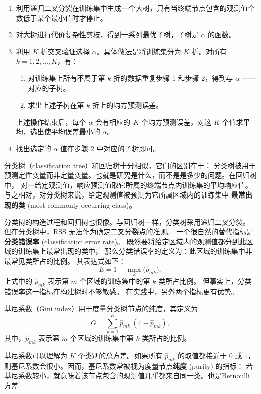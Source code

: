 \begin{example}[算法 8.1 建立回归树]
\begin{enumerate}
  \item 利用递归二叉分裂在训练集中生成一个大树，只有当终端节点包含的观测值个数低于某个最小值时才停止。
  \item 对大树进行代价复杂性剪枝，得到一系列最优子树，子树是 $\alpha$ 的函数。
  \item 利用 $K$ 折交叉验证选择 $\alpha$。具体做法是将训练集分为 $K$ 折。对所有 $k=1,2,\dots,K$，有：
  \begin{enumerate}
    \item[(a)] 对训练集上所有不属于第 $k$ 折的数据重复步骤 1 和步骤 2，得到与 $\alpha$ 一一对应的子树。
    \item[(b)] 求出上述子树在第 $k$ 折上的均方预测误差。
  \end{enumerate}
  上述操作结束后，每个 $\alpha$ 会有相应的 $K$ 个均方预测误差，对这 $K$ 个值求平均，选出使平均误差最小的 $\alpha$。
  \item 找出选定的 $\alpha$ 值在步骤 2 中对应的子树即可。
\end{enumerate}
\end{example}
\begin{definition}[分类树]
    分类树（classification tree）和回归树十分相似，它们的区别在于：
分类树被用于预测定性变量而非定量变量。也就是研究是什么，而不是是多少的问题。在回归树中，
对一给定观测值，响应预测值取它所属的终端节点内训练集的平均响应值。
与之相对，对分类树来说，给定观测值被预测为它所属区域内的训练集中
最\textbf{常出现的类} (most commonly occurring class)。

\end{definition}
分类树的构造过程和回归树也很像。与回归树一样，分类树采用递归二叉分裂。
但在分类树中，RSS 无法作为确定二叉分裂点的准则。
一个很自然的替代指标是\textbf{分类错误率} (classification error rate)。
既然要将给定区域内的观测值都分到此区域的训练集上最常出现的类中，
那么分类错误率的定义为：此区域的训练集中非最常见类所占的比例。
其表达式如下：
\[
E = 1 - \max_k \big(\hat{p}_{mk}\big),
\tag{8.5}
\]
上式中的 $\hat{p}_{mk}$ 表示第 $m$ 个区域的训练集中的第 $k$ 类所占比例。
但事实上，分类错误率这一指标在构建树时不够敏感。
在实践中，另外两个指标更有优势。
\begin{definition}[基尼系数]
基尼系数（Gini index）用于度量分类树节点的纯度，其定义为
\[
G = \sum_{k=1}^K \hat{p}_{mk} \,(1 - \hat{p}_{mk}),
\tag{8.6}
\]
其中，$\hat{p}_{mk}$ 表示第 $m$ 个区域的训练集中第 $k$ 类所占的比例。

基尼系数可以理解为 $K$ 个类别的总方差。如果所有 $\hat{p}_{mk}$ 的取值都接近于 $0$ 或 $1$，
则基尼系数会很小。因而，基尼系数常被视为度量节点\textbf{纯度} (purity) 的指标：
若基尼系数较小，就意味着该节点包含的观测值几乎都来自同一类。也是Bernoulli 方差 
\end{definition}
